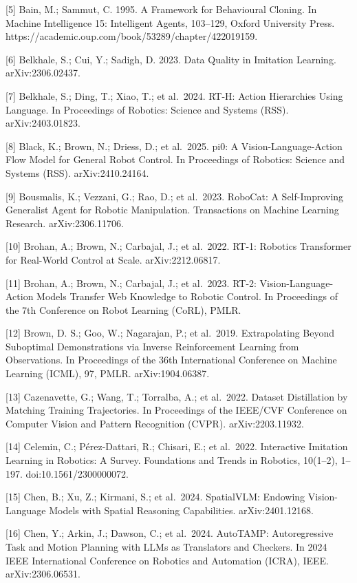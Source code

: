 \documentclass[
  11pt,
]{article}
\begin{document}
{[}5{]} Bain, M.; Sammut, C. 1995. A Framework for Behavioural Cloning.
In Machine Intelligence 15: Intelligent Agents, 103--129, Oxford
University Press. https://academic.oup.com/book/53289/chapter/422019159.

{[}6{]} Belkhale, S.; Cui, Y.; Sadigh, D. 2023. Data Quality in
Imitation Learning. arXiv:2306.02437.

{[}7{]} Belkhale, S.; Ding, T.; Xiao, T.; et al.~2024. RT-H: Action
Hierarchies Using Language. In Proceedings of Robotics: Science and
Systems (RSS). arXiv:2403.01823.

{[}8{]} Black, K.; Brown, N.; Driess, D.; et al.~2025. pi0: A
Vision-Language-Action Flow Model for General Robot Control. In
Proceedings of Robotics: Science and Systems (RSS). arXiv:2410.24164.

{[}9{]} Bousmalis, K.; Vezzani, G.; Rao, D.; et al.~2023. RoboCat: A
Self-Improving Generalist Agent for Robotic Manipulation. Transactions
on Machine Learning Research. arXiv:2306.11706.

{[}10{]} Brohan, A.; Brown, N.; Carbajal, J.; et al.~2022. RT-1:
Robotics Transformer for Real-World Control at Scale. arXiv:2212.06817.

{[}11{]} Brohan, A.; Brown, N.; Carbajal, J.; et al.~2023. RT-2:
Vision-Language-Action Models Transfer Web Knowledge to Robotic Control.
In Proceedings of the 7th Conference on Robot Learning (CoRL), PMLR.

{[}12{]} Brown, D. S.; Goo, W.; Nagarajan, P.; et al.~2019.
Extrapolating Beyond Suboptimal Demonstrations via Inverse Reinforcement
Learning from Observations. In Proceedings of the 36th International
Conference on Machine Learning (ICML), 97, PMLR. arXiv:1904.06387.

{[}13{]} Cazenavette, G.; Wang, T.; Torralba, A.; et al.~2022. Dataset
Distillation by Matching Training Trajectories. In Proceedings of the
IEEE/CVF Conference on Computer Vision and Pattern Recognition (CVPR).
arXiv:2203.11932.

{[}14{]} Celemin, C.; Pérez-Dattari, R.; Chisari, E.; et al.~2022.
Interactive Imitation Learning in Robotics: A Survey. Foundations and
Trends in Robotics, 10(1--2), 1--197. doi:10.1561/2300000072.

{[}15{]} Chen, B.; Xu, Z.; Kirmani, S.; et al.~2024. SpatialVLM:
Endowing Vision-Language Models with Spatial Reasoning Capabilities.
arXiv:2401.12168.

{[}16{]} Chen, Y.; Arkin, J.; Dawson, C.; et al.~2024. AutoTAMP:
Autoregressive Task and Motion Planning with LLMs as Translators and
Checkers. In 2024 IEEE International Conference on Robotics and
Automation (ICRA), IEEE. arXiv:2306.06531.
\end{document}
